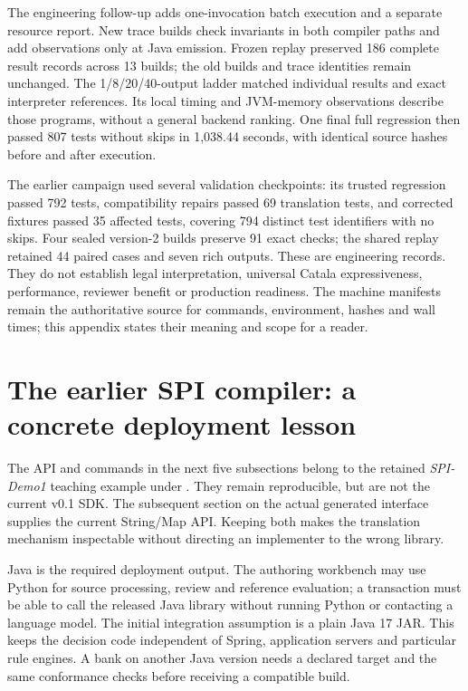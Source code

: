 \documentclass[12pt,a4paper,oneside,openany]{book}
\begin{document}
The engineering follow-up adds one-invocation batch execution and a separate
resource report. New trace builds check invariants in both compiler paths and
add observations only at Java emission. Frozen replay preserved 186 complete
result records across 13 builds; the old builds and trace identities remain
unchanged. The 1/8/20/40-output ladder matched individual results and exact
interpreter references. Its local timing and JVM-memory observations describe
those programs, without a general backend ranking.
One final full regression then passed 807 tests without skips in 1,038.44
seconds, with identical source hashes before and after execution.

The earlier campaign used several validation checkpoints: its trusted regression
passed 792 tests, compatibility repairs passed 69
translation tests, and corrected fixtures passed 35 affected tests, covering
794 distinct test identifiers with no skips. Four sealed version-2 builds
preserve 91 exact checks; the shared replay retained 44 paired cases and seven
rich outputs. These are engineering records. They do not establish legal
interpretation, universal Catala expressiveness, performance, reviewer benefit
or production readiness. The machine manifests remain the authoritative source
for commands, environment, hashes and wall times; this appendix states their
meaning and scope for a reader.

\section{The earlier SPI compiler: a concrete deployment lesson}

The API and commands in the next five subsections belong to the retained
\emph{SPI-Demo1} teaching example under . They remain
reproducible, but are not the current v0.1 SDK. The subsequent section on the actual
generated interface supplies the current String/Map API. Keeping both makes the
translation mechanism inspectable without directing an implementer to the wrong
library.


\label{merge:P-03d-java-delivery:00}

\label{sec:java}

Java is the required deployment output. The authoring workbench may use Python
for source processing, review and reference evaluation; a transaction must be
able to call the released Java library without running Python or contacting a
language model. The initial integration assumption is a plain Java 17 JAR.
This keeps the decision code independent of Spring, application servers and
particular rule engines. A bank on another Java version needs a declared target
and the same conformance checks before receiving a compatible build.
\end{document}
